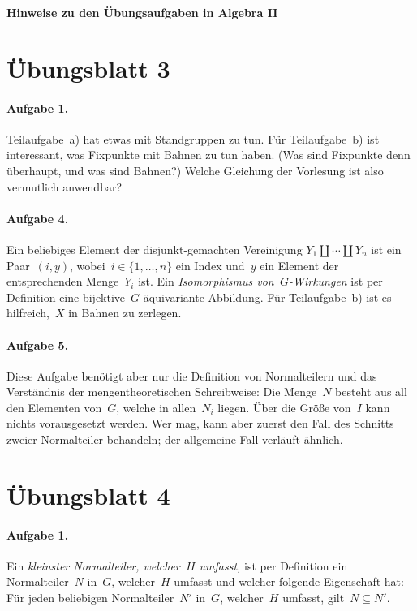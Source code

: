 \documentclass{algblatt}
\begin{document}
\begin{center}\Large \textsf{\textbf{Hinweise zu den Übungsaufgaben in Algebra II}}\end{center}
\vspace{1em}

\section*{Übungsblatt 3}

\paragraph{Aufgabe 1.} Teilaufgabe~a) hat etwas mit Standgruppen zu tun. Für
Teilaufgabe~b) ist interessant, was Fixpunkte mit Bahnen zu tun haben. (Was
sind Fixpunkte denn überhaupt, und was sind Bahnen?) Welche Gleichung der
Vorlesung ist also vermutlich anwendbar?

\paragraph{Aufgabe 4.} Ein beliebiges Element der disjunkt-gemachten
Vereinigung $Y_1 \amalg \cdots \amalg Y_n$ ist ein Paar~$(i,y)$, wobei~$i \in
\{ 1,\ldots,n \}$ ein Index und~$y$ ein Element der entsprechenden Menge~$Y_i$ ist.
Ein \emph{Isomorphismus von~$G$-Wirkungen} ist per Definition eine
bijektive~$G$-äquivariante Abbildung. Für Teilaufgabe~b) ist es hilfreich,~$X$
in Bahnen zu zerlegen.

\paragraph{Aufgabe 5.}
Diese Aufgabe benötigt aber nur die Definition von
Normalteilern und das Verständnis der mengentheoretischen Schreibweise: Die
Menge~$N$ besteht aus all den Elementen von~$G$, welche in allen~$N_i$ liegen. Über die
Größe von~$I$ kann nichts vorausgesetzt werden. Wer mag, kann aber zuerst den
Fall des Schnitts zweier Normalteiler behandeln; der allgemeine Fall verläuft
ähnlich.


\section*{Übungsblatt 4}

\paragraph{Aufgabe 1.} Ein \emph{kleinster Normalteiler, welcher~$H$ umfasst,}
ist per Definition ein Normalteiler~$N$ in~$G$, welcher~$H$ umfasst und welcher
folgende Eigenschaft hat:
Für jeden beliebigen Normalteiler~$N'$ in~$G$, welcher~$H$ umfasst, gilt~$N
\subseteq N'$.
\end{document}
